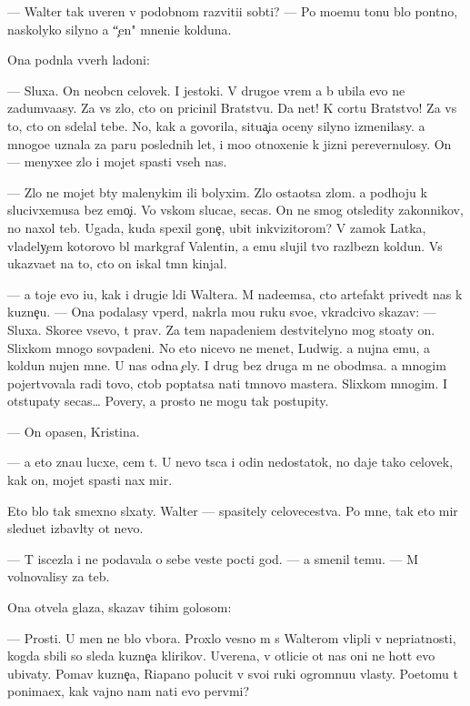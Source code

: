 \documentclass[10pt]{book}
\begin{document}
— Walter tak uveren v podobnom razviti{\y}i sob{\yi}ti{\y}? — Po mo{\y}emu tonu b{\yi}lo pon{\ia}tno, naskolyko silyno {\y}a ``{\c}en{\iu}" mneni{\y}e kolduna.

Ona podn{\ia}la vverh ladoni:

— Sluxa{\y}. On neob{\yi}cn{\yi}{\y} celovek. I jestoki{\y}. V drugo{\y}e vrem{\ia} {\y}a b{\yi} ubila {\y}evo ne zadum{\yi}va{\y}asy. Za vs{\e} zlo, cto on pricinil Bratstvu. Da net! K cortu Bratstvo! Za vs{\e} to, cto on sdelal tebe. No, kak {\y}a govorila, situa{\c}i{\y}a oceny silyno izmenilasy. {\Y}a mnogo{\y}e uznala za paru poslednih let, i mo{\y}o otnoxeni{\y}e k jizni perevernulosy. On — menyxe{\y}e zlo i mojet spasti vseh nas.

— Zlo ne mojet b{\yi}ty malenykim ili bolyxim. Zlo osta{\y}otsa zlom. {\Y}a podhoju k slucivxemusa bez emo{\c}i{\y}. Vo vs{\ia}kom sluca{\y}e, se{\y}cas. On ne smog otsledity zakonnikov, no naxol teb{\ia}. Ugada{\y}, kuda spexil gone{\c}, ubit{\yi}{\y} inkvizitorom? V zamok Latka, vladely{\c}em kotorovo b{\yi}l markgraf Valentin, a {\y}emu slujil tvo{\y} razl{\iu}bezn{\yi}{\y} koldun. Vs{\e} ukaz{\yi}va{\y}et na to, cto on iskal t{\e}mn{\yi}{\y} kinjal.

— {\Y}a toje {\y}evo i{\x}u, kak i drugi{\y}e l{\iu}di Waltera. M{\yi} nade{\y}emsa, cto artefakt prived{\e}t nas k kuzne{\c}u. — Ona podalasy vper{\e}d, nakr{\yi}la mo{\y}u ruku svo{\y}e{\y}, vkradcivo skazav: — Sluxa{\y}. Skore{\y}e vsevo, t{\yi} prav. Za tem napadeni{\y}em de{\y}stvitelyno mog sto{\y}aty on. Slixkom mnogo sovpadeni{\y}. No eto nicevo ne men{\ia}{\y}et, Ludwig. {\Y}a nujna {\y}emu, a koldun nujen mne. U nas odna {\c}ely. I drug bez druga m{\yi} ne obo{\y}d{\e}msa. {\Y}a mnogim pojertvovala radi tovo, ctob{\yi} pop{\yi}tatsa na{\y}ti t{\e}mnovo mastera. Slixkom mnogim. I otstupaty se{\y}cas… Povery, {\y}a prosto ne mogu tak postupity.

— On opasen, Kristina.

— {\Y}a eto zna{\y}u lucxe, cem t{\yi}. U nevo t{\yi}s{\ia}ca i odin nedostatok, no daje tako{\y} celovek, kak on, mojet spasti nax mir.

Eto b{\yi}lo tak smexno sl{\yi}xaty. Walter — spasitely celovecestva. Po mne, tak eto mir sledu{\y}et izbavl{\ia}ty ot nevo.

— T{\yi} iscezla i ne podavala o sebe veste{\y} pocti god. — {\Y}a smenil temu. — M{\yi} volnovalisy za teb{\ia}.

Ona otvela glaza, skazav tihim golosom:

— Prosti. U men{\ia} ne b{\yi}lo v{\yi}bora. Proxlo{\y} vesno{\y} m{\yi} s Walterom vlipli v nepri{\y}atnosti, kogda sbili so sleda kuzne{\c}a klirikov. Uverena, v otlici{\y}e ot nas oni ne hot{\ia}t {\y}evo ubivaty. Po{\y}mav kuzne{\c}a, Riapano polucit v svo{\y}i ruki ogromnu{\y}u vlasty. Poetomu t{\yi} ponima{\y}ex, kak vajno nam na{\y}ti {\y}evo perv{\yi}mi?
\end{document}
